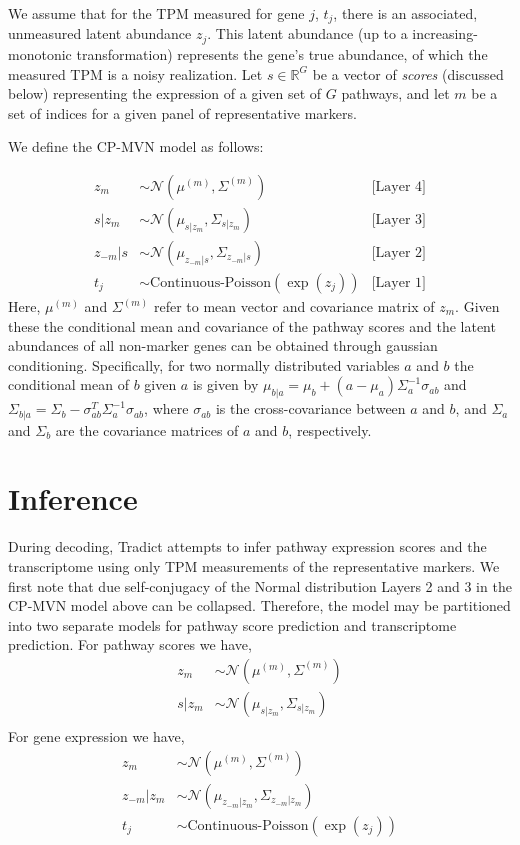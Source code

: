 \documentclass[10pt]{article}
\begin{document}
We assume that for the TPM measured for gene $j$, $t_j$, there is an associated, unmeasured latent abundance $z_j$. This latent abundance (up to a increasing-monotonic transformation) represents the gene's true abundance, of which the measured TPM is a noisy realization. Let $s \in \mathbb{R}^{G}$ be a vector of \emph{scores} (discussed below) representing the expression of a given set of $G$ pathways, and let $m$ be a set of indices for a given panel of representative markers.

We define the CP-MVN model as follows:

\begin{align*}
z_m & \sim \mathcal{N}\left(\mu^{(m)}, \Sigma^{(m)}\right)  & \textrm{[Layer 4]} \\
s|z_m & \sim \mathcal{N}(\mu_{s|z_m}, \Sigma_{s|z_m})  & \textrm{[Layer 3]}\\
z_{-m}|s & \sim \mathcal{N}(\mu_{z_{-m}|s}, \Sigma_{z_{-m}|s}) & \textrm{[Layer 2]}\\
t_j & \sim \textrm{Continuous-Poisson}(\exp(z_j)) & \textrm{[Layer 1]}
\end{align*}
Here, $\mu^{(m)}$ and $\Sigma^{(m)}$ refer to mean vector and covariance matrix of $z_m$. Given these the conditional mean and covariance of the pathway scores and the latent abundances of all non-marker genes can be obtained through gaussian conditioning. Specifically, for two normally distributed variables $a$ and $b$ the conditional mean of $b$ given $a$ is given by $\mu_{b|a} = \mu_b + (a - \mu_a)\Sigma_{a}^{-1}\sigma_{ab}$ and $\Sigma_{b|a} = \Sigma_{b} - \sigma_{ab}^T\Sigma_a^{-1}\sigma_{ab}$, where $\sigma_{ab}$ is the cross-covariance between $a$ and $b$, and $\Sigma_a$ and $\Sigma_b$ are the covariance matrices of $a$ and $b$, respectively.



\section{Inference} \label{inference}


During decoding, Tradict attempts to infer pathway expression scores and the transcriptome using only TPM measurements of the representative markers. We first note that due self-conjugacy of the Normal distribution Layers 2 and 3 in the CP-MVN model above can be collapsed. Therefore, the model may be partitioned into two separate models for pathway score prediction and transcriptome prediction. For pathway scores we have,
\begin{align*}
z_m & \sim \mathcal{N}\left(\mu^{(m)}, \Sigma^{(m)} \right) \\
s|z_m & \sim \mathcal{N}(\mu_{s|z_m}, \Sigma_{s|z_m}) \\
\end{align*}
For gene expression we have,
\begin{align*}
z_m & \sim \mathcal{N}(\mu^{(m)}, \Sigma^{(m)}) \\
z_{-m}|z_m & \sim \mathcal{N}(\mu_{z_{-m}|z_m}, \Sigma_{z_{-m}|z_m}) \\
t_j & \sim \textrm{Continuous-Poisson}(\exp(z_j))
\end{align*}
\end{document}
